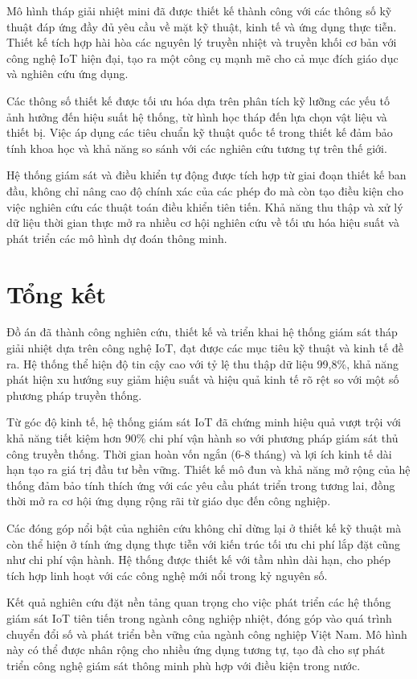 \documentclass[../main.tex]{subfiles}
\begin{document}
Mô hình tháp giải nhiệt mini đã được thiết kế thành công với các thông số kỹ thuật đáp ứng đầy đủ yêu cầu về mặt kỹ thuật, kinh tế và ứng dụng thực tiễn. Thiết kế tích hợp hài hòa các nguyên lý truyền nhiệt và truyền khối cơ bản với công nghệ IoT hiện đại, tạo ra một công cụ mạnh mẽ cho cả mục đích giáo dục và nghiên cứu ứng dụng.

Các thông số thiết kế được tối ưu hóa dựa trên phân tích kỹ lưỡng các yếu tố ảnh hưởng đến hiệu suất hệ thống, từ hình học tháp đến lựa chọn vật liệu và thiết bị. Việc áp dụng các tiêu chuẩn kỹ thuật quốc tế trong thiết kế đảm bảo tính khoa học và khả năng so sánh với các nghiên cứu tương tự trên thế giới.

Hệ thống giám sát và điều khiển tự động được tích hợp từ giai đoạn thiết kế ban đầu, không chỉ nâng cao độ chính xác của các phép đo mà còn tạo điều kiện cho việc nghiên cứu các thuật toán điều khiển tiên tiến. Khả năng thu thập và xử lý dữ liệu thời gian thực mở ra nhiều cơ hội nghiên cứu về tối ưu hóa hiệu suất và phát triển các mô hình dự đoán thông minh.

\section{Tổng kết}
\label{sec:final_summary}

Đồ án đã thành công nghiên cứu, thiết kế và triển khai hệ thống giám sát tháp giải nhiệt dựa trên công nghệ IoT, đạt được các mục tiêu kỹ thuật và kinh tế đề ra. Hệ thống thể hiện độ tin cậy cao với tỷ lệ thu thập dữ liệu 99,8\%, khả năng phát hiện xu hướng suy giảm hiệu suất và hiệu quả kinh tế rõ rệt so với một số phương pháp truyền thống.

Từ góc độ kinh tế, hệ thống giám sát IoT đã chứng minh hiệu quả vượt trội với khả năng tiết kiệm hơn 90\% chi phí vận hành so với phương pháp giám sát thủ công truyền thống. Thời gian hoàn vốn ngắn (6-8 tháng) và lợi ích kinh tế dài hạn tạo ra giá trị đầu tư bền vững. Thiết kế mô đun và khả năng mở rộng của hệ thống đảm bảo tính thích ứng với các yêu cầu phát triển trong tương lai, đồng thời mở ra cơ hội ứng dụng rộng rãi từ giáo dục đến công nghiệp.

Các đóng góp nổi bật của nghiên cứu không chỉ dừng lại ở thiết kế kỹ thuật mà còn thể hiện ở tính ứng dụng thực tiễn với kiến trúc tối ưu chi phí lắp đặt cũng như chi phí vận hành. Hệ thống được thiết kế với tầm nhìn dài hạn, cho phép tích hợp linh hoạt với các công nghệ mới nổi trong kỷ nguyên số.

Kết quả nghiên cứu đặt nền tảng quan trọng cho việc phát triển các hệ thống giám sát IoT tiên tiến trong ngành công nghiệp nhiệt, đóng góp vào quá trình chuyển đổi số và phát triển bền vững của ngành công nghiệp Việt Nam. Mô hình này có thể được nhân rộng cho nhiều ứng dụng tương tự, tạo đà cho sự phát triển công nghệ giám sát thông minh phù hợp với điều kiện trong nước.
\end{document}

